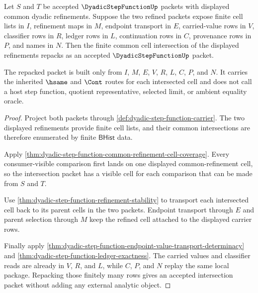 \begin{theorem}
\label{thm:dyadic-step-function-refinement-intersection-closure}
Let $S$ and $T$ be accepted $\DyadicStepFunctionUp$ packets with displayed common dyadic refinements. Suppose the two refined packets expose finite cell lists in $I$, refinement maps in $M$, endpoint transport in $E$, carried-value rows in $V$, classifier rows in $R$, ledger rows in $L$, continuation rows in $C$, provenance rows in $P$, and names in $N$. Then the finite common cell intersection of the displayed refinements repacks as an accepted $\DyadicStepFunctionUp$ packet.

The repacked packet is built only from $I$, $M$, $E$, $V$, $R$, $L$, $C$, $P$, and $N$. It carries the inherited $\hsame$ and $\Cont$ routes for each intersected cell and does not call a host step function, quotient representative, selected limit, or ambient equality oracle.
\end{theorem}
\begin{proof}
Project both packets through \autoref{def:dyadic-step-function-carrier}. The two displayed refinements provide finite cell lists, and their common intersections are therefore enumerated by finite $\mathsf{BHist}$ data.

Apply \autoref{thm:dyadic-step-function-common-refinement-cell-coverage}. Every consumer-visible comparison first lands on one displayed common-refinement cell, so the intersection packet has a visible cell for each comparison that can be made from $S$ and $T$.

Use \autoref{thm:dyadic-step-function-refinement-stability} to transport each intersected cell back to its parent cells in the two packets. Endpoint transport through $E$ and parent selection through $M$ keep the refined cell attached to the displayed carrier rows.

Finally apply \autoref{thm:dyadic-step-function-endpoint-value-transport-determinacy} and \autoref{thm:dyadic-step-function-ledger-exactness}. The carried values and classifier reads are already in $V$, $R$, and $L$, while $C$, $P$, and $N$ replay the same local package. Repacking those finitely many rows gives an accepted intersection packet without adding any external analytic object.
\end{proof}

